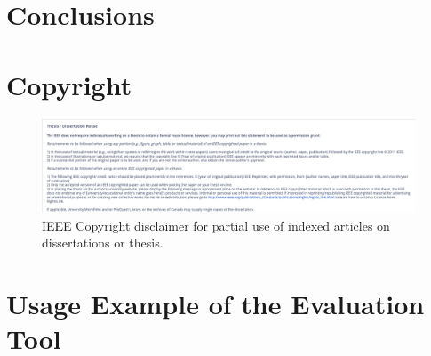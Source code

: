 \documentclass[Ingles,Final]{ic-tese-v3}
\begin{document}


\chapter{Conclusions}




%



\appendix
\chapter{Copyright}
\label{appendix:A}
\begin{figure}[h!]
    \centering
    \includegraphics[width=0.99\textwidth]{related_work/figs/copyright.png}
    \caption{IEEE Copyright disclaimer for partial use of indexed articles on dissertations or thesis.}
    \label{fig:copyright}
\end{figure}
\chapter{Usage Example of the Evaluation Tool}

\end{document}
